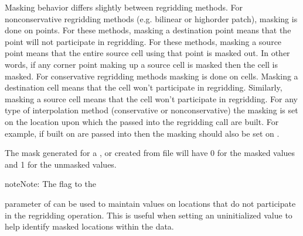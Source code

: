 \documentclass[letterpaper,10pt,english]{sphinxmanual}
\begin{document}
Masking behavior differs slightly between regridding methods. For non\sphinxhyphen{}conservative regridding methods
(e.g. bilinear or high\sphinxhyphen{}order patch), masking is done on points. For these methods, masking a destination
point means that the point will not participate in regridding. For these
methods, masking a source point means that the entire source cell using that point is masked out.
In other words, if any corner point making up a source cell is masked then the cell is masked.
For conservative regridding methods masking is done on cells.
Masking a destination cell means that the cell won’t participate in regridding.
Similarly, masking a source cell means that the cell won’t participate in regridding.
For any type of interpolation method (conservative or non\sphinxhyphen{}conservative)
the masking is set on the location upon which the
{\hyperref[\detokenize{field:ESMF.api.field.Field}]{}} passed into the regridding call are built.
For example, if {\hyperref[\detokenize{field:ESMF.api.field.Field}]{}} built on
{\hyperref[\detokenize{StaggerLoc:ESMF.api.constants.StaggerLoc.CENTER}]{}} are passed into
{\hyperref[\detokenize{regrid:ESMF.api.regrid.Regrid}]{}}
then the masking should also be set on {\hyperref[\detokenize{StaggerLoc:ESMF.api.constants.StaggerLoc.CENTER}]{}}.

The mask generated for a {\hyperref[\detokenize{grid:ESMF.api.grid.Grid}]{}},
{\hyperref[\detokenize{mesh:ESMF.api.mesh.Mesh}]{}} or {\hyperref[\detokenize{locstream:ESMF.api.locstream.LocStream}]{}} created
from file will have 0 for the masked values and 1 for the unmasked values.

\begin{sphinxadmonition}{note}{Note:}
The {\hyperref[\detokenize{Region:ESMF.api.constants.Region.SELECT}]{}} flag to the
\end{sphinxadmonition}

 parameter of {\hyperref[\detokenize{regrid:ESMF.api.regrid.Regrid}]{}} can be used to
maintain {\hyperref[\detokenize{field:ESMF.api.field.Field}]{}} values on locations that do not
participate in the regridding operation. This is useful when setting an
uninitialized value to help identify masked locations within the
{\hyperref[\detokenize{field:ESMF.api.field.Field}]{}} data.
\end{document}
